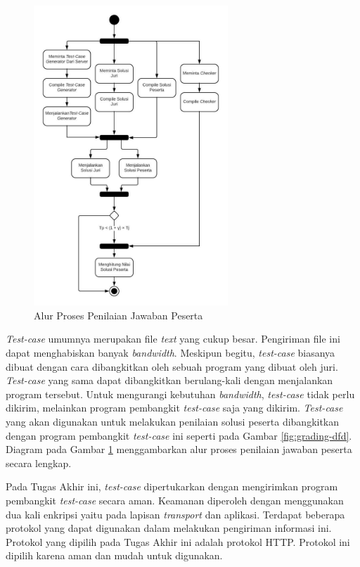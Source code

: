 \begin{figure}[ht!]
    \centering
    \includegraphics[width=0.65\textwidth]{images/total-grader-activity}
    \caption{Alur Proses Penilaian Jawaban Peserta}
    \label{fig:total-grader-activity}
\end{figure}

\par \textit{Test-case} umumnya merupakan file \textit{text} yang cukup besar. Pengiriman file ini dapat menghabiskan banyak \textit{bandwidth}. Meskipun begitu, \textit{test-case} biasanya dibuat dengan cara dibangkitkan oleh sebuah program yang dibuat oleh juri. \textit{Test-case} yang sama dapat dibangkitkan berulang-kali dengan menjalankan program tersebut. Untuk mengurangi kebutuhan \textit{bandwidth}, \textit{test-case} tidak perlu dikirim, melainkan program pembangkit \textit{test-case} saja yang dikirim. \textit{Test-case} yang akan digunakan untuk melakukan penilaian solusi peserta dibangkitkan dengan program pembangkit \textit{test-case} ini seperti pada Gambar \ref{fig:grading-dfd}. Diagram pada Gambar \ref{fig:total-grader-activity} menggambarkan alur proses penilaian jawaban peserta secara lengkap.

\par Pada Tugas Akhir ini, \textit{test-case} dipertukarkan dengan mengirimkan program pembangkit \textit{test-case} secara aman. Keamanan diperoleh dengan menggunakan dua kali enkripsi yaitu pada lapisan \textit{transport} dan aplikasi. Terdapat beberapa protokol yang dapat digunakan dalam melakukan pengiriman informasi ini. Protokol yang dipilih pada Tugas Akhir ini adalah protokol HTTP. Protokol ini dipilih karena aman dan mudah untuk digunakan.


